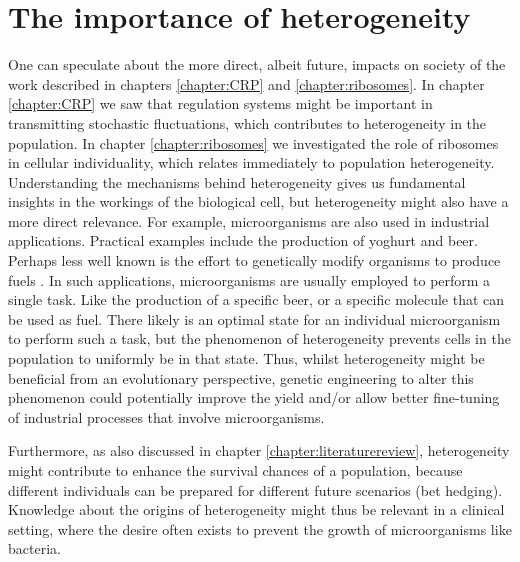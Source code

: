 \section{The importance of heterogeneity}

One can speculate about the more direct, albeit future, impacts on society of 
the work described in chapters \ref{chapter:CRP} and \ref{chapter:ribosomes}.
%
%
In chapter \ref{chapter:CRP} we saw that regulation systems might be important in transmitting stochastic fluctuations, 
which contributes to heterogeneity in the population.
%
In chapter \ref{chapter:ribosomes} we investigated the role of ribosomes in cellular individuality, which relates immediately to population heterogeneity.
%
Understanding the mechanisms behind heterogeneity gives us fundamental insights in the workings of the biological cell, 
but heterogeneity might also have a more direct relevance.
%
For example, microorganisms are also used in industrial applications.
%
Practical examples include the production of yoghurt and beer.
Perhaps less well known is the effort to 
genetically modify organisms to produce fuels \cite{Lee2008, Savakis2013}. 
%
In such applications, microorganisms are usually employed to perform a single task.
%
Like the production of a specific beer, or a specific molecule that can be used as fuel. 
%
There likely is an optimal state for an individual microorganism to perform such a task, 
but the phenomenon of heterogeneity prevents cells in the population to uniformly be in that state.
%
%
Thus, whilst heterogeneity might be beneficial from an evolutionary perspective,
genetic engineering to alter this phenomenon could potentially improve the yield and/or allow better fine-tuning of industrial processes that involve microorganisms.

Furthermore, as also discussed in chapter \ref{chapter:literaturereview},
heterogeneity might contribute to enhance the survival chances of a population, 
because different individuals can be prepared for different future scenarios (bet hedging).
%
Knowledge about the origins of heterogeneity might thus be relevant in a clinical setting,
where the desire often exists 
to prevent the growth of microorganisms like bacteria.











